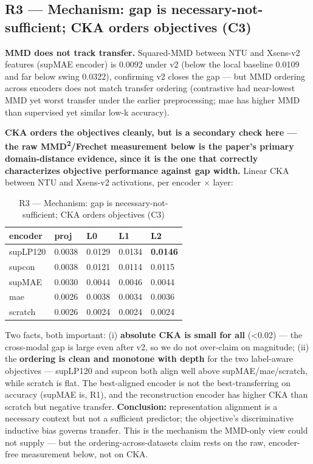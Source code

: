 \subsection{R3 --- Mechanism: gap is necessary-not-sufficient; CKA orders objectives (C3)}

\textbf{MMD does not track transfer.} Squared-MMD between NTU and Xsens-v2 features (supMAE encoder) is 0.0092 under v2 (below the local baseline 0.0109 and far below swing 0.0322), confirming v2 closes the gap --- but MMD ordering across encoders does not match transfer ordering (contrastive had near-lowest MMD yet worst transfer under the earlier preprocessing; mae has higher MMD than supervised yet similar low-k accuracy).

\textbf{CKA orders the objectives cleanly, but is a secondary check here --- the raw MMD\textsuperscript{2}/Frechet measurement below is the paper's primary domain-distance evidence, since it is the one that correctly characterizes objective performance against gap width.} Linear CKA between NTU and Xsens-v2 activations, per encoder $\times$ layer:

\begin{table}[!t]
\centering
\caption{R3 --- Mechanism: gap is necessary-not-sufficient; CKA orders objectives (C3)}
\small
\begin{tabular}{lllll}
\toprule
encoder & proj & L0 & L1 & L2 \\
\midrule
supLP120 & 0.0038 & 0.0129 & 0.0134 & \textbf{0.0146} \\
supcon & 0.0038 & 0.0121 & 0.0114 & 0.0115 \\
supMAE & 0.0030 & 0.0044 & 0.0046 & 0.0044 \\
mae & 0.0026 & 0.0038 & 0.0034 & 0.0036 \\
scratch & 0.0026 & 0.0024 & 0.0024 & 0.0024 \\
\bottomrule
\end{tabular}
\end{table}

Two facts, both important: (i) \textbf{absolute CKA is small for all} (<0.02) --- the cross-modal gap is large even after v2, so we do not over-claim on magnitude; (ii) the \textbf{ordering is clean and monotone with depth} for the two label-aware objectives --- supLP120 and supcon both align well above supMAE/mae/scratch, while scratch is flat. The best-aligned encoder is not the best-transferring on accuracy (supMAE is, R1), and the reconstruction encoder has higher CKA than scratch but negative transfer. \textbf{Conclusion:} representation alignment is a necessary context but not a sufficient predictor; the objective's discriminative inductive bias governs transfer. This is the mechanism the MMD-only view could not supply --- but the ordering-across-datasets claim rests on the raw, encoder-free measurement below, not on CKA.

